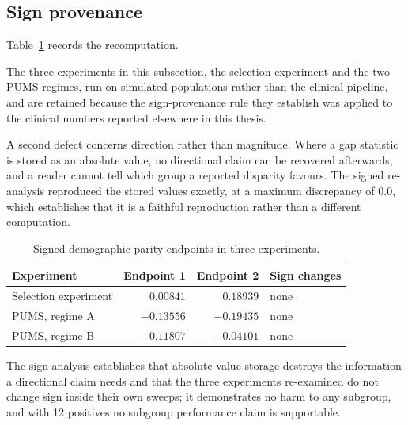 \subsection{Sign provenance}
\label{sup:sec:signprov}

Table~\ref{sup:tab:signed} records the recomputation.

The three experiments in this subsection, the selection experiment and the two
PUMS regimes, run on simulated populations rather than the clinical pipeline,
and are retained because the sign-provenance rule they establish was
applied to the clinical numbers reported elsewhere in this thesis.

A second defect concerns direction rather than magnitude. Where a gap statistic
is stored as an absolute value, no directional claim can be recovered afterwards,
and a reader cannot tell which group a reported disparity favours. The signed
re-analysis reproduced the stored values exactly, at a maximum discrepancy of
$0.0$, which establishes that it is a faithful reproduction rather than a
different computation.

\begin{table}[H]
\caption[Signed parity endpoints, three experiments]{Signed demographic parity endpoints in three experiments.}
\centering
\small
\begin{tabular}{lrrl}
\toprule
\textbf{Experiment} & \textbf{Endpoint 1} & \textbf{Endpoint 2} &
\textbf{Sign changes} \\
\midrule
Selection experiment & $0.00841$  & $0.18939$  & none \\
PUMS, regime A       & $-0.13556$ & $-0.19435$ & none \\
PUMS, regime B       & $-0.11807$ & $-0.04101$ & none \\
\bottomrule
\end{tabular}
\label{sup:tab:signed}
\end{table}

The sign analysis establishes that absolute-value storage destroys the
information a directional claim needs and that the three experiments
re-examined do not change sign inside their own sweeps; it demonstrates no
harm to any subgroup, and with 12 positives no subgroup performance claim is
supportable.


